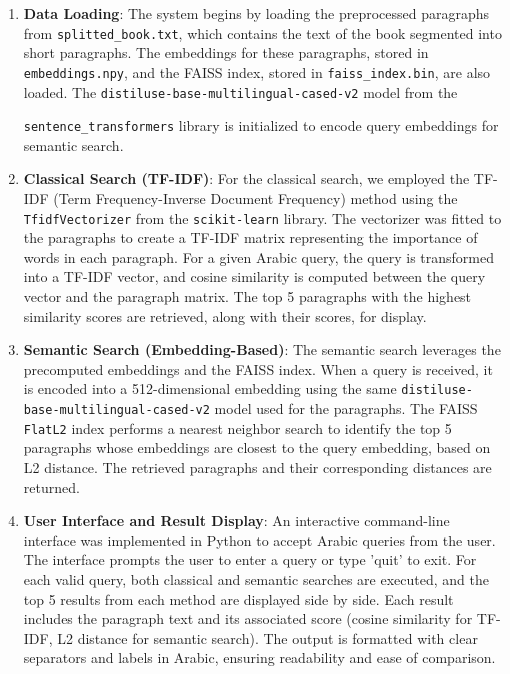 \documentclass[12pt]{article}
\begin{document}
\begin{enumerate}
    \item \textbf{Data Loading}: The system begins by loading the preprocessed paragraphs from \texttt{splitted\_book.txt}, which contains the text of the book segmented into short paragraphs. The embeddings for these paragraphs, stored in \texttt{embeddings.npy}, and the FAISS index, stored in \texttt{faiss\_index.bin}, are also loaded. The \texttt{distiluse-base-multilingual-cased-v2} model from the 
    
    \texttt{sentence\_transformers} library is initialized to encode query embeddings for semantic search.
    
    \item \textbf{Classical Search (TF-IDF)}: For the classical search, we employed the TF-IDF (Term Frequency-Inverse Document Frequency) method using the \texttt{TfidfVectorizer} from the \texttt{scikit-learn} library. The vectorizer was fitted to the paragraphs to create a TF-IDF matrix representing the importance of words in each paragraph. For a given Arabic query, the query is transformed into a TF-IDF vector, and cosine similarity is computed between the query vector and the paragraph matrix. The top 5 paragraphs with the highest similarity scores are retrieved, along with their scores, for display.
    
    \item \textbf{Semantic Search (Embedding-Based)}: The semantic search leverages the precomputed embeddings and the FAISS index. When a query is received, it is encoded into a 512-dimensional embedding using the same \texttt{distiluse-base-multilingual-cased-v2} model used for the paragraphs. The FAISS \texttt{FlatL2} index performs a nearest neighbor search to identify the top 5 paragraphs whose embeddings are closest to the query embedding, based on L2 distance. The retrieved paragraphs and their corresponding distances are returned.
    
    \item \textbf{User Interface and Result Display}: An interactive command-line interface was implemented in Python to accept Arabic queries from the user. The interface prompts the user to enter a query or type 'quit' to exit. For each valid query, both classical and semantic searches are executed, and the top 5 results from each method are displayed side by side. Each result includes the paragraph text and its associated score (cosine similarity for TF-IDF, L2 distance for semantic search). The output is formatted with clear separators and labels in Arabic, ensuring readability and ease of comparison.
\end{enumerate}
\end{document}
